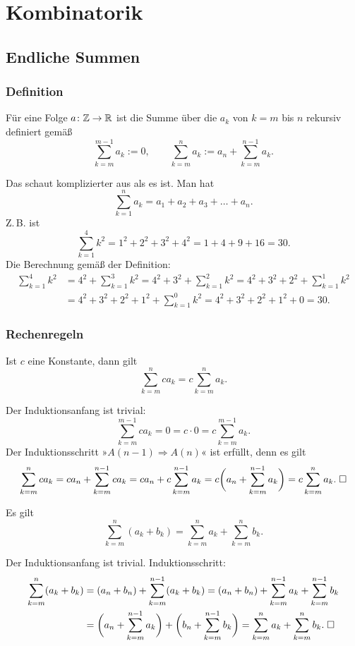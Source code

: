 
\chapter{Kombinatorik}

\section{Endliche Summen}
\subsection{Definition}

\begin{Definition}[Summe]
Für eine Folge $a\colon\mathbb Z\to\mathbb R$ ist die Summe über die $a_k$
von $k=m$ bis $n$ rekursiv definiert gemäß%
\[
\sum_{k=m}^{m-1} a_k := 0,\qquad
\sum_{k=m}^n a_k := a_n+\sum_{k=m}^{n-1} a_k.
\]
\end{Definition}
Das schaut komplizierter aus als es ist. Man hat
\[\sum_{k=1}^n a_k = a_1+a_2+a_3+\ldots+a_n.\]
Z.\,B. ist
\[\sum_{k=1}^4 k^2 = 1^2+2^2+3^2+4^2 = 1+4+9+16 = 30.\]
Die Berechnung gemäß der Definition:
\begin{align*}
\sum_{k=1}^4 k^2 &= 4^2+\sum_{k=1}^3 k^2
= 4^2+3^2+\sum_{k=1}^2 k^2
= 4^2+3^2+2^2+\sum_{k=1}^1 k^2\\
&= 4^2+3^2+2^2+1^2+\sum_{k=1}^{0} k^2 = 4^2+3^2+2^2+1^2+0 = 30.
\end{align*}

\subsection{Rechenregeln}
\begin{Satz}\label{Summe-Hom}%
Ist $c$ eine Konstante, dann gilt
\[\sum_{k=m}^n ca_k = c\sum_{k=m}^n a_k.\]
\end{Satz}
Der Induktionsanfang ist trivial:
\[\sum_{k=m}^{m-1} ca_k = 0 = c\cdot 0 = c\sum_{k=m}^{m-1} a_k.\]
Der Induktionsschritt »$A(n-1)\Rightarrow A(n)$« ist erfüllt, denn es gilt
\[\sum_{k=m}^n ca_k = ca_n+\sum_{k=m}^{n-1} ca_k = ca_n+c\sum_{k=m}^{n-1} a_k
= c\bigg(a_n+\sum_{k=m}^{n-1} a_k\bigg) = c\sum_{k=m}^n a_k.\;\Box\]

\begin{Satz}\label{Summe-Add}%
Es gilt
\[\sum_{k=m}^n (a_k+b_k) = \sum_{k=m}^n a_k+\sum_{k=m}^n b_k.\]
\end{Satz}
Der Induktionsanfang ist trivial. Induktionsschritt:
\begin{align*}
\sum_{k=m}^n (a_k+b_k) &= (a_n+b_n)+\sum_{k=m}^{n-1} (a_k+b_k)
= (a_n+b_n)+\sum_{k=m}^{n-1} a_k+\sum_{k=m}^{n-1} b_k\\
&= \bigg(a_n+\sum_{k=m}^{n-1}a_k\bigg)+\bigg(b_n+\sum_{k=m}^{n-1}b_k\bigg)
= \sum_{k=m}^n a_k+\sum_{k=m}^n b_k.\;\Box
\end{align*}

